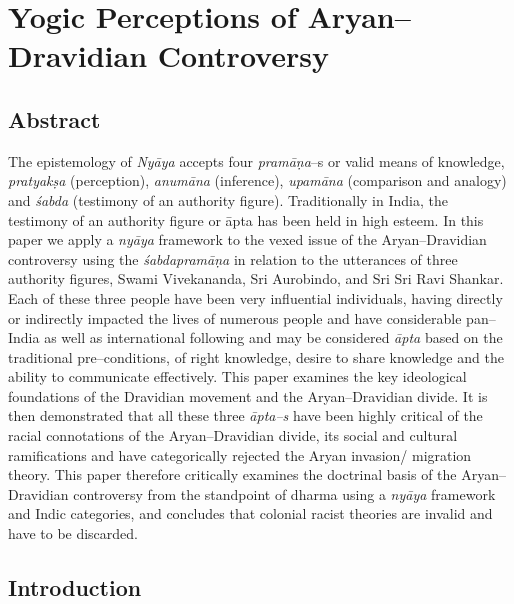 
\chapter{Yogic Perceptions of Aryan–Dravidian Controversy}\label{chap09}



\section*{Abstract}

The epistemology of \textit{Nyāya} accepts four \textit{pramāṇa}–s or valid means of knowledge, \textit{pratyakṣa} (perception), \textit{anumāna} (inference), \textit{upamāna} (comparison and analogy) and \textit{śabda} (testimony of an authority figure). Traditionally in India, the testimony of an authority figure or āpta has been held in high esteem. In this paper we apply a \textit{nyāya} framework to the vexed issue of the Aryan–Dravidian controversy using the \textit{śabdapramāṇa} in relation to the utterances of three authority figures, Swami Vivekananda, Sri Aurobindo, and Sri Sri Ravi Shankar. Each of these three people have been very influential individuals, having directly or indirectly impacted the lives of numerous people and have considerable pan–India as well as international following and may be considered\textit{ āpta} based on the traditional pre–conditions, of right knowledge, desire to share knowledge and the ability to communicate effectively. This paper examines the key ideological foundations of the Dravidian movement and the Aryan–Dravidian divide. It is then demonstrated that all these three \textit{āpta–s} have been highly critical of the racial connotations of the Aryan–Dravidian divide, its social and cultural ramifications and have categorically rejected the Aryan invasion/ migration theory. This paper therefore critically examines the doctrinal basis of the Aryan–Dravidian controversy from the standpoint of dharma using a \textit{nyāya} framework and Indic categories, and concludes that colonial racist theories are invalid and have to be discarded.


\section*{Introduction}

